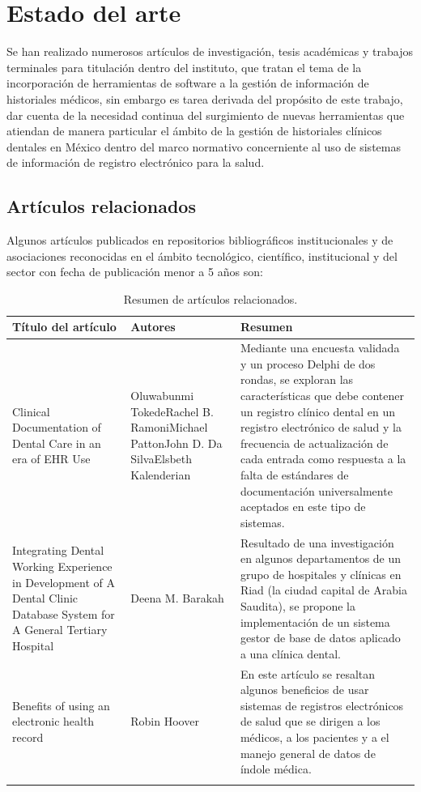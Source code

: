 \newpage
\section{Estado del arte}

Se han realizado numerosos artículos de investigación, tesis académicas y trabajos terminales para titulación dentro del instituto, que tratan el tema de la incorporación de herramientas de software a la gestión de información de historiales médicos, sin embargo es tarea derivada del propósito de este trabajo, dar cuenta de la necesidad continua del surgimiento de nuevas herramientas que atiendan de manera particular el ámbito de la gestión de historiales clínicos dentales en México dentro del marco normativo concerniente al uso de sistemas de información de registro electrónico para la salud. 

\subsection{Artículos relacionados}

\noindent 
Algunos artículos publicados en repositorios bibliográficos institucionales y de asociaciones reconocidas en el ámbito tecnológico, científico, institucional y del sector con fecha de publicación menor a 5 años son:


\begin{longtable}{|p{4cm}|p{4cm}|p{8cm}|}
\hline\textbf{Título del artículo} & \textbf{Autores} & \textbf{Resumen} \\ \hline
Clinical Documentation of Dental Care in an era of EHR Use 
& Oluwabunmi Tokede\newline Rachel B. Ramoni\newline Michael Patton\newline John D. Da Silva\newline Elsbeth Kalenderian 
& Mediante una encuesta validada y un proceso Delphi de dos rondas, se exploran las características que debe contener un registro clínico dental en un registro electrónico de salud y la frecuencia de actualización de cada entrada como respuesta a la falta de estándares de documentación universalmente aceptados en este tipo de sistemas.\\ \hline
Integrating Dental Working Experience in Development of A Dental Clinic
Database System for A General Tertiary Hospital 
& Deena M. Barakah
& Resultado de una investigación en algunos departamentos de un grupo de hospitales y clínicas en Riad (la ciudad capital de Arabia Saudita), se propone la implementación de un sistema gestor de base de datos aplicado a una clínica dental.\\ \hline
Benefits of using an electronic health record 
& Robin Hoover
& En este artículo se resaltan algunos beneficios de usar sistemas de registros electrónicos de salud que se dirigen a los médicos, a los pacientes y a el manejo general de datos de índole médica.\\ \hline
\caption{Resumen de artículos relacionados.}
\label{table:1}
\end{longtable}


